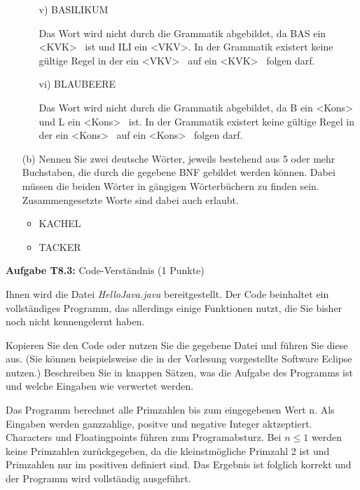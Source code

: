 \begin{itemize}
\begin{itemize}
  \item [v)] BASILIKUM
  
  Das Wort wird nicht durch die Grammatik abgebildet, da BAS ein
  \textless KVK\textgreater~ ist und ILI ein \textless VKV\textgreater. 
  In der Grammatik existert keine gültige Regel in der ein 
  \textless VKV\textgreater~ auf ein \textless KVK\textgreater~ folgen darf.

  \item [vi)] BLAUBEERE
  
  Das Wort wird nicht durch die Grammatik abgebildet, da  B ein 
  \textless Kons\textgreater~ und L ein \textless Kons\textgreater~ ist.
  In der Grammatik existert keine gültige Regel in der ein 
  \textless Kons\textgreater~ auf ein \textless Kons\textgreater~ folgen darf.


\end{itemize}

\newpage

  \item [(b)] Nennen Sie zwei deutsche Wörter, jeweils bestehend aus 5 oder mehr Buchstaben, die durch die gegebene BNF gebildet werden können. Dabei müssen die beiden Wörter in gängigen Wörterbüchern zu finden sein. Zusammengesetzte Worte sind dabei auch erlaubt.
  
  \begin{itemize}
    \item KACHEL
    \item TACKER
  \end{itemize}
\end{itemize}

\newpage

\textbf{Aufgabe T8.3:} Code-Verständnis (1 Punkte)

Ihnen wird die Datei \textit{HelloJava.java} bereitgestellt. Der Code beinhaltet ein vollständiges Programm, das allerdings einige Funktionen nutzt, die Sie bisher noch nicht kennengelernt haben.

Kopieren Sie den Code oder nutzen Sie die gegebene Datei und führen Sie diese aus. (Sie können beispielsweise die in der Vorlesung vorgestellte Software Eclipse nutzen.) Beschreiben Sie in knappen Sätzen, was die Aufgabe des Programms ist und welche Eingaben wie verwertet werden.

Das Programm berechnet alle Primzahlen bis zum eingegebenen Wert n. Als Eingaben werden ganzzahlige, positve und negative
Integer aktzeptiert. Characters und Floatingpoints führen zum Programabsturz. Bei
$n \le 1$ werden keine Primzahlen zurückgegeben, da die kleinstmögliche Primzahl 2 ist
und Primzahlen nur im positiven definiert sind. Das Ergebnis ist folglich korrekt und 
der Programm wird vollständig ausgeführt.

